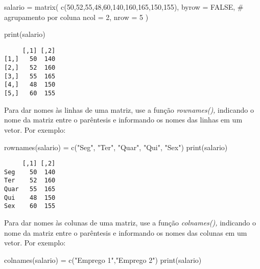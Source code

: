 \documentclass[
  letterpaper,
  DIV=11,
  numbers=noendperiod]{scrreprt}
\newenvironment{Shaded}{\begin{snugshade}}{\end{snugshade}}
\newcommand{\AttributeTok}[1]{\textcolor[rgb]{0.40,0.45,0.13}{#1}}
\newcommand{\CommentTok}[1]{\textcolor[rgb]{0.37,0.37,0.37}{#1}}
\newcommand{\ConstantTok}[1]{\textcolor[rgb]{0.56,0.35,0.01}{#1}}
\newcommand{\DecValTok}[1]{\textcolor[rgb]{0.68,0.00,0.00}{#1}}
\newcommand{\FunctionTok}[1]{\textcolor[rgb]{0.28,0.35,0.67}{#1}}
\newcommand{\NormalTok}[1]{\textcolor[rgb]{0.00,0.23,0.31}{#1}}
\newcommand{\OtherTok}[1]{\textcolor[rgb]{0.00,0.23,0.31}{#1}}
\newcommand{\StringTok}[1]{\textcolor[rgb]{0.13,0.47,0.30}{#1}}
\begin{document}
\begin{Shaded}
\begin{Highlighting}[]
\NormalTok{salario }\OtherTok{=} \FunctionTok{matrix}\NormalTok{(}
  \FunctionTok{c}\NormalTok{(}\DecValTok{50}\NormalTok{,}\DecValTok{52}\NormalTok{,}\DecValTok{55}\NormalTok{,}\DecValTok{48}\NormalTok{,}\DecValTok{60}\NormalTok{,}\DecValTok{140}\NormalTok{,}\DecValTok{160}\NormalTok{,}\DecValTok{165}\NormalTok{,}\DecValTok{150}\NormalTok{,}\DecValTok{155}\NormalTok{),}
  \AttributeTok{byrow =} \ConstantTok{FALSE}\NormalTok{, }\CommentTok{\# agrupamento por coluna}
  \AttributeTok{ncol =} \DecValTok{2}\NormalTok{,}
  \AttributeTok{nrow =} \DecValTok{5}
\NormalTok{)}

\FunctionTok{print}\NormalTok{(salario)}
\end{Highlighting}
\end{Shaded}

\begin{verbatim}
     [,1] [,2]
[1,]   50  140
[2,]   52  160
[3,]   55  165
[4,]   48  150
[5,]   60  155
\end{verbatim}

Para dar nomes às linhas de uma matriz, use a função \emph{rownames(),}
indicando o nome da matriz entre o parêntesis e informando os nomes das
linhas em um vetor. Por exemplo:

\begin{Shaded}
\begin{Highlighting}[]
\FunctionTok{rownames}\NormalTok{(salario) }\OtherTok{=} \FunctionTok{c}\NormalTok{(}\StringTok{"Seg"}\NormalTok{, }\StringTok{"Ter"}\NormalTok{, }\StringTok{"Quar"}\NormalTok{, }\StringTok{"Qui"}\NormalTok{, }\StringTok{"Sex"}\NormalTok{)}
\FunctionTok{print}\NormalTok{(salario)}
\end{Highlighting}
\end{Shaded}

\begin{verbatim}
     [,1] [,2]
Seg    50  140
Ter    52  160
Quar   55  165
Qui    48  150
Sex    60  155
\end{verbatim}

Para dar nomes às colunas de uma matriz, use a função \emph{colnames(),}
indicando o nome da matriz entre o parêntesis e informando os nomes das
colunas em um vetor. Por exemplo:

\begin{Shaded}
\begin{Highlighting}[]
\FunctionTok{colnames}\NormalTok{(salario) }\OtherTok{=} \FunctionTok{c}\NormalTok{(}\StringTok{"Emprego 1"}\NormalTok{,}\StringTok{"Emprego 2"}\NormalTok{)}
\FunctionTok{print}\NormalTok{(salario)}
\end{Highlighting}
\end{Shaded}
\end{document}
